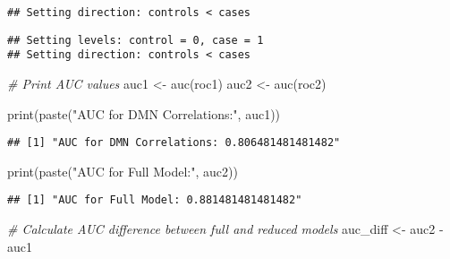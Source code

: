 \documentclass[
]{article}
\newenvironment{Shaded}{\begin{snugshade}}{\end{snugshade}}
\newcommand{\CommentTok}[1]{\textcolor[rgb]{0.56,0.35,0.01}{\textit{#1}}}
\newcommand{\FunctionTok}[1]{\textcolor[rgb]{0.00,0.00,0.00}{#1}}
\newcommand{\NormalTok}[1]{#1}
\newcommand{\OtherTok}[1]{\textcolor[rgb]{0.56,0.35,0.01}{#1}}
\newcommand{\SpecialCharTok}[1]{\textcolor[rgb]{0.00,0.00,0.00}{#1}}
\newcommand{\StringTok}[1]{\textcolor[rgb]{0.31,0.60,0.02}{#1}}
\begin{document}
\begin{verbatim}
## Setting direction: controls < cases
\end{verbatim}

\begin{Shaded}
\end{Shaded}

\begin{verbatim}
## Setting levels: control = 0, case = 1
## Setting direction: controls < cases
\end{verbatim}

\begin{Shaded}
\begin{Highlighting}[]
\CommentTok{\# Print AUC values}
\NormalTok{auc1 }\OtherTok{\textless{}{-}} \FunctionTok{auc}\NormalTok{(roc1)}
\NormalTok{auc2 }\OtherTok{\textless{}{-}} \FunctionTok{auc}\NormalTok{(roc2)}


\FunctionTok{print}\NormalTok{(}\FunctionTok{paste}\NormalTok{(}\StringTok{"AUC for DMN Correlations:"}\NormalTok{, auc1))}
\end{Highlighting}
\end{Shaded}

\begin{verbatim}
## [1] "AUC for DMN Correlations: 0.806481481481482"
\end{verbatim}

\begin{Shaded}
\begin{Highlighting}[]
\FunctionTok{print}\NormalTok{(}\FunctionTok{paste}\NormalTok{(}\StringTok{"AUC for Full Model:"}\NormalTok{, auc2))}
\end{Highlighting}
\end{Shaded}

\begin{verbatim}
## [1] "AUC for Full Model: 0.881481481481482"
\end{verbatim}

\begin{Shaded}
\begin{Highlighting}[]
\CommentTok{\# Calculate AUC difference between full and reduced models}
\NormalTok{auc\_diff }\OtherTok{\textless{}{-}}\NormalTok{ auc2 }\SpecialCharTok{{-}}\NormalTok{ auc1}
\end{Highlighting}
\end{Shaded}
\end{document}

